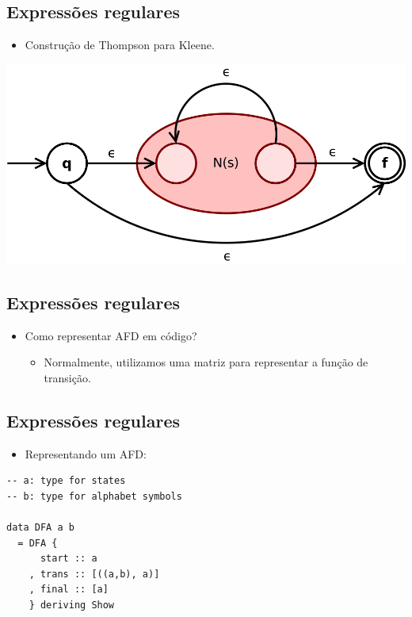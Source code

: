 \documentclass[11pt]{article}
\begin{document}
\subsection*{Expressões regulares}
\label{sec:org3fdd3ca}

\begin{itemize}
\item Construção de Thompson para Kleene.
\end{itemize}

\begin{center}
\includegraphics[width=.9\linewidth]{./Thompson-kleene-star.png}
\end{center}
\subsection*{Expressões regulares}
\label{sec:org8850c02}

\begin{itemize}
\item Como representar AFD em código?
\begin{itemize}
\item Normalmente, utilizamos uma matriz para representar a função de transição.
\end{itemize}
\end{itemize}
\subsection*{Expressões regulares}
\label{sec:org93704b2}

\begin{itemize}
\item Representando um AFD:
\end{itemize}

\begin{verbatim}
-- a: type for states
-- b: type for alphabet symbols

data DFA a b
  = DFA {
      start :: a
    , trans :: [((a,b), a)]
    , final :: [a]
    } deriving Show
\end{verbatim}
\end{document}
